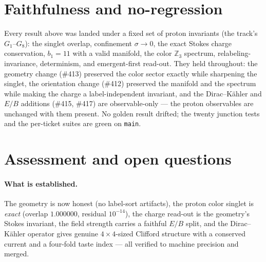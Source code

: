 \documentclass[11pt]{article}
\newcommand{\Z}{\mathbb{Z}}
\newcommand{\sigmacol}{\sigma}
\begin{document}
\section{Faithfulness and no-regression}
Every result above was landed under a fixed set of proton invariants (the track's
$G_1$--$G_8$): the singlet overlap, confinement $\sigmacol\to0$, the exact Stokes charge
conservation, $b_1=11$ with a valid manifold, the color $\Z_3$ spectrum, relabeling-
invariance, determinism, and emergent-first read-out. They held throughout: the geometry
change (\#413) preserved the color sector exactly while sharpening the singlet, the
orientation change (\#412) preserved the manifold and the spectrum while making the
charge a label-independent invariant, and the Dirac--K\"ahler and $E/B$ additions
(\#415, \#417) are observable-only --- the proton observables are unchanged with them
present. No golden result drifted; the twenty junction tests and the per-ticket suites
are green on \texttt{main}.

\section{Assessment and open questions}
\label{sec:assess}
\paragraph{What is established.} The geometry is now honest (no label-sort artifacts),
the proton color singlet is \emph{exact} (overlap $1.000000$, residual $10^{-14}$), the
charge read-out is the geometry's Stokes invariant, the field strength carries a faithful
$E/B$ split, and the Dirac--K\"ahler operator gives genuine $4\times4$-sized Clifford
structure with a conserved current and a four-fold taste index --- all verified to
machine precision and merged.
\end{document}
